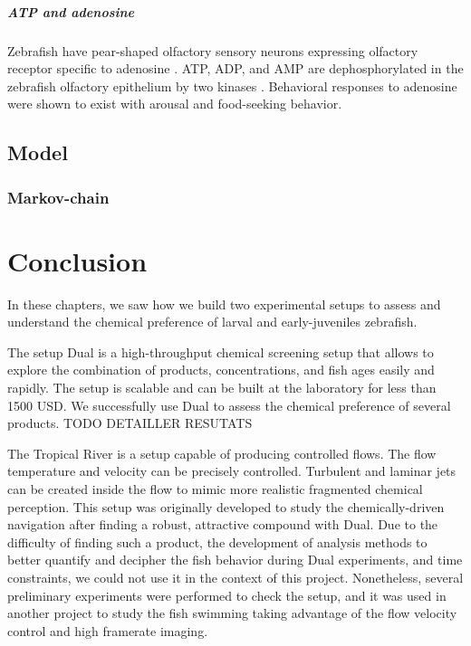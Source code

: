   \paragraph{ATP and adenosine}
  Zebrafish have pear-shaped olfactory sensory neurons expressing olfactory receptor specific to adenosine \cite{}. ATP, ADP, and AMP are dephosphorylated in the zebrafish olfactory epithelium by two kinases \cite{}. Behavioral responses to adenosine were shown to exist with arousal and food-seeking behavior.

  \section{Model}
  \subsection{Markov-chain}

\chapter{Conclusion}

  In these chapters, we saw how we build two experimental setups to assess and understand the chemical preference of larval and early-juveniles zebrafish.


  The setup Dual is a high-throughput chemical screening setup that allows to explore the combination of products, concentrations, and fish ages easily and rapidly. The setup is scalable and can be built at  the laboratory for less than 1500 USD. We successfully use Dual to assess the chemical preference of several products. TODO DETAILLER RESUTATS


  The Tropical River is a setup capable of producing controlled flows. The flow temperature and velocity can be precisely controlled. Turbulent and laminar jets can be created inside the flow to mimic more realistic fragmented chemical perception. This setup was originally developed to study the chemically-driven navigation after finding a robust, attractive compound with Dual. Due to the difficulty of finding such a product, the development of analysis methods to better quantify and decipher the fish behavior during Dual experiments, and time constraints, we could not use it in the context of this project. Nonetheless, several preliminary experiments were performed to check the setup, and it was used in another project to study the fish swimming taking advantage of the flow velocity control and high framerate imaging.
